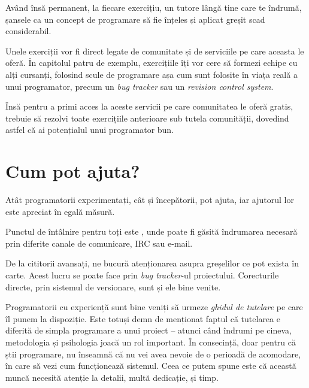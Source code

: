 Având însă permanent, la fiecare exercițiu, un tutore lângă tine care te
îndrumă, șansele ca un concept de programare să fie înțeles și aplicat
greșit scad considerabil.

Unele exerciții vor fi direct legate de comunitate și de serviciile pe care
aceasta le oferă. În capitolul patru de exemplu, exercițiile îți vor cere să
formezi echipe cu alți cursanți, folosind scule de programare așa cum sunt
folosite în viața reală a unui programator, precum un \textsl{bug tracker} sau
un \textsl{revision control system}.

Însă pentru a primi acces la aceste servicii pe care comunitatea {\phpro} le
oferă gratis, trebuie să rezolvi toate exercițiile anterioare sub tutela
comunității, dovedind astfel că ai potențialul unui programator bun.

\section*{Cum pot ajuta?}
{}

Atât programatorii experimentați, cât și începătorii, pot ajuta, iar ajutorul
lor este apreciat în egală măsură.

Punctul de întâlnire pentru toți este {\phpro}, unde poate fi găsită îndrumarea
necesară prin diferite canale de comunicare, IRC sau e-mail.

De la cititorii avansați, ne bucură atenționarea asupra greșelilor ce pot exista
în carte. Acest lucru se poate face prin \textit{bug tracker}-ul proiectului.
Corecturile directe, prin sistemul de versionare, sunt și ele bine venite.

Programatorii cu experiență sunt bine veniți să urmeze \textsl{ghidul de
tutelare} pe care îl punem la dispoziție. Este totuși demn de menționat faptul
că tutelarea e diferită de simpla programare a unui proiect -- atunci când
îndrumi pe cineva, metodologia și psihologia joacă un rol important. În
consecință, doar pentru că știi programare, nu înseamnă că nu vei avea nevoie de
o perioadă de acomodare, în care să vezi cum funcționează sistemul. Ceea ce
putem spune este că această muncă necesită atenție la detalii, multă dedicație,
și timp.

